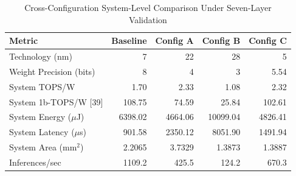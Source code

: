 \begin{table}[htbp]
\centering
\caption{Cross-Configuration System-Level Comparison Under Seven-Layer Validation}
\label{tab:cross_config}
\begin{tabular}{lrrrr}
\toprule
\textbf{Metric} & \textbf{Baseline} & \textbf{Config A} & \textbf{Config B} & \textbf{Config C} \\
\midrule
  Technology (nm) & 7 & 22 & 28 & 5 \\
  Weight Precision (bits) & 8 & 4 & 3 & 5.54 \\
  System TOPS/W & 1.70 & 2.33 & 1.08 & 2.32 \\
  System 1b-TOPS/W [39] & 108.75 & 74.59 & 25.84 & 102.61 \\
  System Energy ($\mu$J) & 6398.02 & 4664.06 & 10099.04 & 4826.41 \\
  System Latency ($\mu$s) & 901.58 & 2350.12 & 8051.90 & 1491.94 \\
  System Area (mm$^2$) & 2.2065 & 3.7329 & 1.3873 & 1.3887 \\
  Inferences/sec & 1109.2 & 425.5 & 124.2 & 670.3 \\
\bottomrule
\end{tabular}
\end{table}
